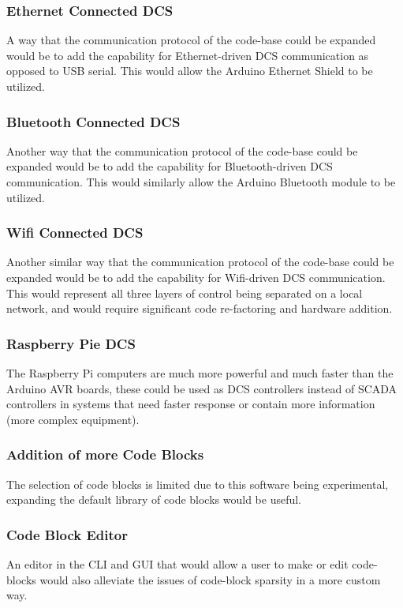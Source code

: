 \documentclass[../main.tex]{subfiles}
\begin{document}
\subsubsection{Ethernet Connected DCS} A way that the communication protocol of the code-base could be expanded would be to add the capability for Ethernet-driven DCS communication as opposed to USB serial. This would allow the Arduino Ethernet Shield to be utilized.

\subsubsection{Bluetooth Connected DCS} Another way that the communication protocol of the code-base could be expanded would be to add the capability for Bluetooth-driven DCS communication. This would similarly allow the Arduino Bluetooth module to be utilized.

\subsubsection{Wifi Connected DCS} Another similar way that the communication protocol of the code-base could be expanded would be to add the capability for Wifi-driven DCS communication. This would represent all three layers of control being separated on a local network, and would require significant code re-factoring and hardware addition.

\subsubsection{Raspberry Pie DCS} The Raspberry Pi computers are much more powerful and much faster than the Arduino AVR boards, these could be used as DCS controllers instead of SCADA controllers in systems that need faster response or contain more information (more complex equipment).

\subsubsection{Addition of more Code Blocks} The selection of code blocks is limited due to this software being experimental, expanding the default library of code blocks would be useful.

\subsubsection{Code Block Editor} An editor in the CLI and GUI that would allow a user to make or edit code-blocks would also alleviate the issues of code-block sparsity in a more custom way.
\end{document}
